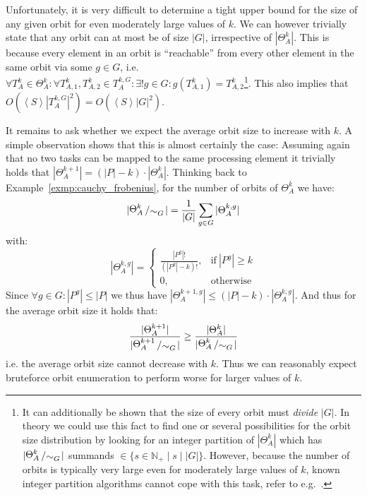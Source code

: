 \noindent
Unfortunately, it is very difficult to determine a tight upper bound for the
size of any given orbit for even moderately large values of $k$. We can however
trivially state that any orbit can at most be of size $|G|$, irrespective of
$|\Theta_A^k|$. This is because every element in an orbit is ``reachable'' from
every other element in the same orbit via some $g \in G$, i.e. $\forall T_A^k
\in \Theta_A^k: \forall T_{A,1}^k, T_{A,2}^k \in T_A^{k,G}: \exists! g \in G:
g(T_{A,1}^k) = T_{A,2}^k$\footnote{It can additionally be shown that the size
of every orbit must \textit{divide} $|G|$. In theory we could use this fact to
find one or several possibilities for the orbit size distribution by looking
for an integer partition of $|\Theta_A^k|$ which has
$|\bigslant{\Theta_A^k}{\sim_G}|$ summands $\in \{s \in \mathbb{N}_+ \mid s
\mid |G|\}$.  However, because the number of orbits is typically very large
even for moderately large values of $k$, known integer partition algorithms
cannot cope with this task, refer to e.g.~\cite{Zoghbi94}.}. This also implies that
$O(\left<S\right> |T_A^{k,G}|^2) = O(\left<S\right> |G|^2)$.

It remains to ask whether we expect the average orbit size to increase with
$k$. A simple observation shows that this is almost certainly the case:
Assuming again that no two tasks can be mapped to the same processing element
it trivially holds that $|\Theta_A^{k+1}| = (|P| - k) \cdot |\Theta_A^k|$.
Thinking back to Example~\ref{exmp:cauchy_frobenius}, for the number of orbits
of $\Theta_A^k$ we have:
%
\begin{equation*}
 |\bigslant{\Theta_A^k}{\sim_G}| =
 \frac{1}{|G|} \sum_{g \in G} |\Theta_A^{k,g}|
\end{equation*}
%
with:
%
\begin{equation*}
 |\Theta_A^{k,g}| =
 \begin{cases}
   \frac{|P^g|!}{(|P^g| - k)!}, &\text{if}\ |P^g| \geq k\\
   0,                           &\text{otherwise}
 \end{cases}
\end{equation*}
%
Since $\forall g \in G: |P^g| \leq |P|$ we thus have
$|\Theta_A^{k+1,g}| \leq (|P| - k) \cdot |\Theta_{A}^{k,g}|$. And thus
for the average orbit size it holds that:
%
\begin{equation*}
  \frac{|\Theta_A^{k+1}|}{|\bigslant{\Theta_A^{k+1}}{\sim_G}|}
    \geq
  \frac{|\Theta_A^k|}{|\bigslant{\Theta_A^k}{\sim_G}|}
\end{equation*}
%
i.e. the average orbit size cannot decrease with $k$. Thus we can reasonably
expect bruteforce orbit enumeration to perform worse for larger
values of $k$.

